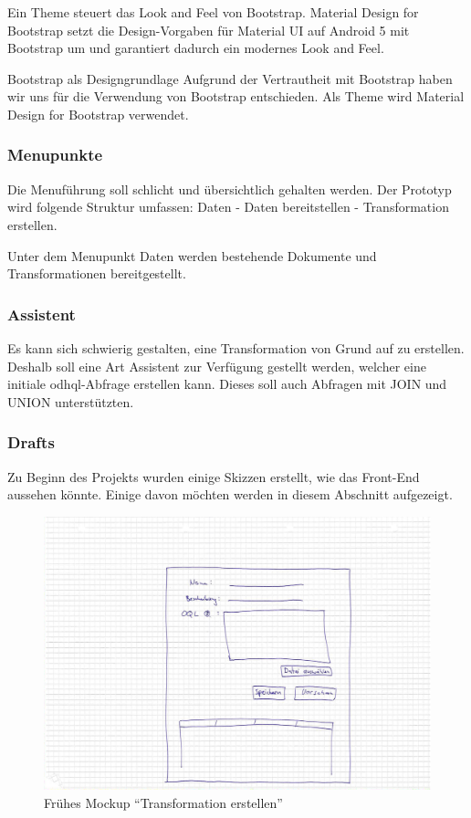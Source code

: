 Ein Theme steuert das Look and Feel von Bootstrap. Material Design for Bootstrap setzt die Design-Vorgaben für Material UI auf Android 5 mit Bootstrap um und garantiert dadurch ein modernes Look and Feel.

\begin{decision}[label=dec:frontend:bootstrap]{Bootstrap als Designgrundlage}
Aufgrund der Vertrautheit mit Bootstrap haben wir uns für die Verwendung von Bootstrap entschieden. Als Theme wird Material Design for Bootstrap verwendet.
\end{decision}

\subsubsection{Menupunkte}
Die Menuführung soll schlicht und übersichtlich gehalten werden. Der Prototyp wird folgende Struktur umfassen: Daten - Daten bereitstellen - Transformation erstellen. 

Unter dem Menupunkt Daten werden bestehende Dokumente und Transformationen bereitgestellt.

\subsubsection{Assistent}
Es kann sich schwierig gestalten, eine Transformation von Grund auf zu erstellen. Deshalb soll eine Art Assistent zur Verfügung gestellt werden, welcher eine initiale \acs{odhql}-Abfrage erstellen kann. Dieses soll auch Abfragen mit JOIN und UNION unterstützten.

\subsubsection{Drafts}
Zu Beginn des Projekts wurden einige Skizzen erstellt, wie das Front-End aussehen könnte. Einige davon möchten werden in diesem Abschnitt aufgezeigt.
\begin{figure}[H]
    
    \includegraphics[width=0.8\linewidth]{fig/mockup_hcdi}
    \caption{Frühes Mockup ``Transformation erstellen''}
    \label{fig:pd:mockup-upload}
\end{figure}

